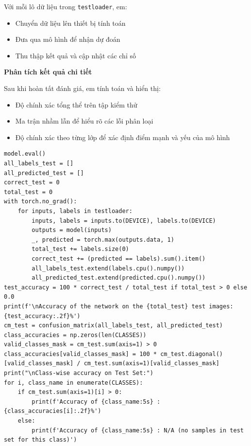 \documentclass[12pt, a4paper, openany]{report}
\begin{document}
Với mỗi lô dữ liệu trong \texttt{testloader}, em:
\begin{itemize}
    \item Chuyển dữ liệu lên thiết bị tính toán
    \item Đưa qua mô hình để nhận dự đoán
    \item Thu thập kết quả và cập nhật các chỉ số
\end{itemize}

\textbf{Phân tích kết quả chi tiết} 

Sau khi hoàn tất đánh giá, em tính toán và hiển thị:
\begin{itemize}
    \item Độ chính xác tổng thể trên tập kiểm thử
    \item Ma trận nhầm lẫn để hiểu rõ các lỗi phân loại
    \item Độ chính xác theo từng lớp để xác định điểm mạnh và yếu của mô hình
\end{itemize}

\begin{verbatim}
model.eval()
all_labels_test = []
all_predicted_test = []
correct_test = 0
total_test = 0
with torch.no_grad():
    for inputs, labels in testloader:
        inputs, labels = inputs.to(DEVICE), labels.to(DEVICE)
        outputs = model(inputs)
        _, predicted = torch.max(outputs.data, 1)
        total_test += labels.size(0)
        correct_test += (predicted == labels).sum().item()
        all_labels_test.extend(labels.cpu().numpy())
        all_predicted_test.extend(predicted.cpu().numpy())
test_accuracy = 100 * correct_test / total_test if total_test > 0 else 0.0
print(f'\nAccuracy of the network on the {total_test} test images: {test_accuracy:.2f}%')
cm_test = confusion_matrix(all_labels_test, all_predicted_test)
class_accuracies = np.zeros(len(CLASSES))
valid_classes_mask = cm_test.sum(axis=1) > 0
class_accuracies[valid_classes_mask] = 100 * cm_test.diagonal()[valid_classes_mask] / cm_test.sum(axis=1)[valid_classes_mask]
print("\nClass-wise accuracy on Test Set:")
for i, class_name in enumerate(CLASSES):
    if cm_test.sum(axis=1)[i] > 0:
        print(f'Accuracy of {class_name:5s} : {class_accuracies[i]:.2f}%')
    else:
        print(f'Accuracy of {class_name:5s} : N/A (no samples in test set for this class)')
\end{verbatim}
\end{document}
